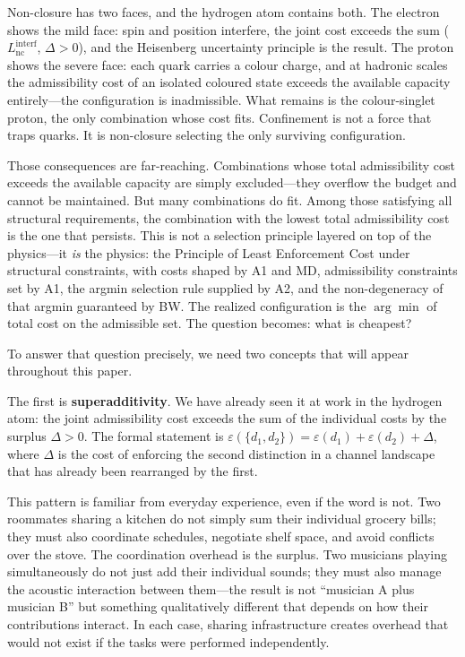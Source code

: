 \documentclass[11pt]{article}
\begin{document}
Non-closure has two faces, and the hydrogen atom contains both.  The electron shows the mild face: spin and position interfere, the joint cost exceeds the sum ($L_{\mathrm{nc}}^{\mathrm{interf}}$, $\Delta > 0$), and the Heisenberg uncertainty principle is the result.  The proton shows the severe face: each quark carries a colour charge, and at hadronic scales the admissibility cost of an isolated coloured state exceeds the available capacity entirely---the configuration is inadmissible.  What remains is the colour-singlet proton, the only combination whose cost fits.  Confinement is not a force that traps quarks.  It is non-closure selecting the only surviving configuration.

Those consequences are far-reaching.  Combinations whose total admissibility cost exceeds the available capacity are simply excluded---they overflow the budget and cannot be maintained.  But many combinations do fit.  Among those satisfying all structural requirements, the combination with the lowest total admissibility cost is the one that persists.  This is not a selection principle layered on top of the physics---it \emph{is} the physics: the Principle of Least Enforcement Cost under structural constraints, with costs shaped by A1 and MD, admissibility constraints set by A1, the argmin selection rule supplied by A2, and the non-degeneracy of that argmin guaranteed by BW.  The realized configuration is the $\arg\min$ of total cost on the admissible set.  The question becomes: what is cheapest?

To answer that question precisely, we need two concepts that will appear throughout this paper.

The first is \textbf{superadditivity}.  We have already seen it at work in the hydrogen atom: the joint admissibility cost exceeds the sum of the individual costs by the surplus $\Delta > 0$.  The formal statement is $\varepsilon(\{d_1, d_2\}) = \varepsilon(d_1) + \varepsilon(d_2) + \Delta$, where $\Delta$ is the cost of enforcing the second distinction in a channel landscape that has already been rearranged by the first.

This pattern is familiar from everyday experience, even if the word is not.  Two roommates sharing a kitchen do not simply sum their individual grocery bills; they must also coordinate schedules, negotiate shelf space, and avoid conflicts over the stove.  The coordination overhead is the surplus.  Two musicians playing simultaneously do not just add their individual sounds; they must also manage the acoustic interaction between them---the result is not ``musician A plus musician B'' but something qualitatively different that depends on how their contributions interact.  In each case, sharing infrastructure creates overhead that would not exist if the tasks were performed independently.
\end{document}
